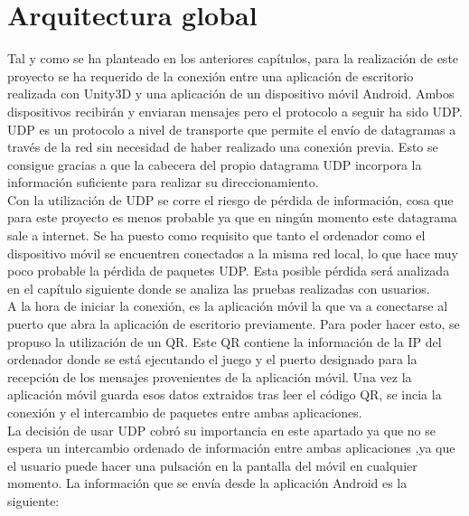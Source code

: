 \section{Arquitectura global}
\label{cap4:sec:global}

Tal y como se ha planteado en los anteriores cap\'itulos, para la realizaci\'on de este proyecto se ha requerido de la conexi\'on entre una aplicaci\'on de escritorio realizada con Unity3D y una aplicaci\'on de un dispositivo m\'ovil Android. Ambos dispositivos recibir\'an y enviaran mensajes pero el protocolo a seguir ha sido UDP. UDP es un protocolo a nivel de transporte que permite el env\'io de datagramas a trav\'es de la red sin necesidad de haber realizado una conexi\'on previa. Esto se consigue gracias a que la cabecera del propio datagrama UDP incorpora la informaci\'on suficiente para realizar su direccionamiento.
\\
Con la utilizaci\'on de UDP se corre el riesgo de p\'erdida de informaci\'on, cosa que para este proyecto es menos probable ya que en ning\'un momento este datagrama sale a internet. Se ha puesto como requisito que tanto el ordenador como el dispositivo m\'ovil se encuentren conectados a la misma red local, lo que hace muy poco probable la p\'erdida de paquetes UDP. Esta posible p\'erdida ser\'a analizada en el cap\'itulo siguiente donde se analiza las pruebas realizadas con usuarios.
\\


A la hora de iniciar la conexi\'on, es la aplicaci\'on m\'ovil la que va a conectarse al puerto que abra la aplicaci\'on de escritorio previamente. Para poder hacer esto, se propuso la utilizaci\'on de un QR. Este QR contiene la informaci\'on de la IP del ordenador donde se est\'a ejecutando el juego y el puerto designado para la recepci\'on de los mensajes provenientes de la aplicaci\'on m\'ovil. Una vez la aplicaci\'on m\'ovil guarda esos datos extraidos tras leer el c\'odigo QR, se incia la conexi\'on y el intercambio de paquetes entre ambas aplicaciones.
\\
La decisi\'on de usar UDP cobr\'o su importancia en este apartado ya que no se espera un intercambio ordenado de informaci\'on entre ambas aplicaciones ,ya que el usuario puede hacer una pulsaci\'on en la pantalla del m\'ovil en cualquier momento. La informaci\'on que se env\'ia desde la aplicaci\'on Android es la siguiente:

